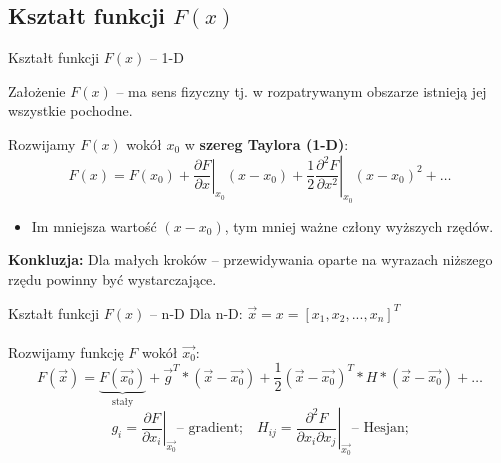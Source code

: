 \subsection{Kształt funkcji $ F(x) $}
  \begin{frame}{Kształt funkcji $ F(x) $ -- 1-D}
    \begin{block}{Założenie}
      $ F(x) $ -- ma sens fizyczny tj. w rozpatrywanym
      obszarze istnieją jej wszystkie pochodne.
    \end{block}
    Rozwijamy $F(x)$ wokół $x_0$ w \textbf{szereg Taylora (1-D)}:
    \begin{displaymath}
      F(x) = F(x_0) + \left. \frac{\partial F}{\partial x} \right|_{x_0}(x - x_0) +
      \left. \frac{1}{2} \frac{\partial^2 F}{\partial x^2} \right|_{x_0}(x - x_0)^2 +
      \dots
    \end{displaymath}
    \begin{itemize}
      \item Im mniejsza wartość $ (x - x_0) $, tym mniej ważne człony
      wyższych rzędów.
    \end{itemize}
    \textbf{Konkluzja:} Dla małych kroków -- przewidywania oparte
    na wyrazach niższego rzędu powinny być wystarczające.

  \end{frame}

  \begin{frame}{Kształt funkcji $ F(x) $ -- n-D}
    Dla n-D: $ \vec{x} = x = [x_1, x_2, ..., x_n]^T $ \\
    \text{ } \\
    Rozwijamy funkcję $ F $ wokół $ \vec{x_0} $:
    \begin{displaymath}
      F(\vec{x}) = \underbrace{F(\vec{x_0})}_{\text{stały}} +
      \vec{g}^T * (\vec{x} - \vec{x_0}) +
      \frac{1}{2}(\vec{x} - \vec{x_0})^T * H * (\vec{x} - \vec{x_0}) + \dots
    \end{displaymath}
    \begin{displaymath}
      g_i = \left. \frac{\partial F}{\partial x_i} \right|_{\vec{x_0}} \text{-- gradient;}\quad
      H_{ij} = \left. \frac{\partial^2 F}{\partial x_i \partial x_j} \right|_{\vec{x_0}}\text{-- Hesjan;}
    \end{displaymath}

  \end{frame}

